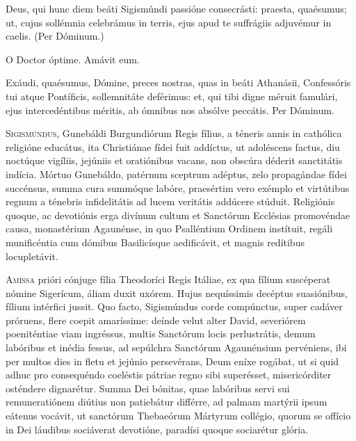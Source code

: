 \begin{caputFesti}
\end{caputFesti}


\parsOratio
Deus, qui hunc diem beáti Sigismúndi passióne consecrásti:
praesta, quaésumus;
ut, cujus sollémnia celebrámus in terris,
ejus apud te suffrágiis adjuvémur in caelis.
(Per Dóminum.)

O Doctor óptime.
Amávit eum.

\parsOratio
Exáudi, quaésumus, Dómine, preces nostras,
quas in beáti Athanásii, Confessóris tui atque Pontíficis,
sollemnitáte deférimus:
et, qui tibi digne méruit famulári,
ejus intercedéntibus méritis,
ab ómnibus nos absólve peccátis.
Per Dóminum.

\horaNocturnusII


\lettrine{S}{igismúndus,} Gunebáldi Burgundiórum Regis fílius,
a téneris annis in cathólica religióne educátus,
ita Christiánae fídei fuit addíctus,
ut adoléscens factus, diu noctúque vigíliis, jejúniis et oratiónibus vacans,
non obscúra déderit sanctitátis indícia.
Mórtuo Gunebáldo, patérnum sceptrum adéptus,
zelo propagándae fídei succénsus,
summa cura summóque labóre, praesértim vero exémplo et virtútibus
regnum a ténebris infidelitátis ad lucem veritátis addúcere stúduit.
Religiónis quoque, ac devotiónis erga divínum cultum
et Sanctórum Ecclésias promovéndae causa,
monastérium Agaunénse, in quo Psalléntium Ordinem instítuit,
regáli munificéntia cum dómibus Basilicísque aedificávit,
et magnis redítibus locupletávit.



\lettrine{A}{míssa} prióri cónjuge fília Theodoríci Regis Itáliae,
ex qua fílium suscéperat nómine Sigerícum,
áliam duxit uxórem.
Hujus nequíssimis decéptus suasiónibus, fílium intérfici jussit.
Quo facto, Sigismúndus corde compúnctus, super cadáver próruens,
flere coepit amaríssime: deínde velut alter David,
severiórem poeniténtiae viam ingréssus, multis Sanctórum locis perlustrátis,
demum labóribus et inédia fessus, ad sepúlchra Sanctórum Agaunénsium pervéniens,
ibi per multos dies in fletu et jejúnio persevérans,
Deum eníxe rogábat, ut si quid adhuc pro consequéndo coeléstis pátriae
regno sibi superésset, misericórditer osténdere dignarétur.
Summa Dei bónitas, quae labóribus servi sui remuneratiónem
diútius non patiebátur différre,
ad palmam martýrii ipsum eátenus vocávit,
ut sanctórum Thebaeórum Mártyrum collégio,
quorum se offício in Dei láudibus sociáverat devotióne,
paradísi quoque sociarétur glória.

